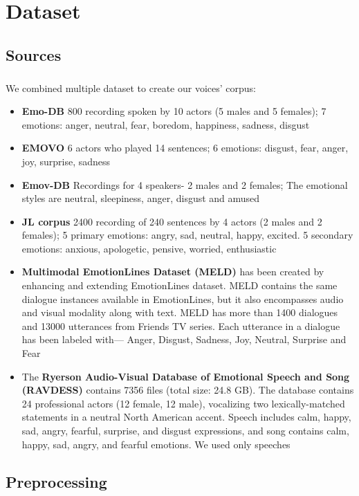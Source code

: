 \chapter{Dataset}

\section{Sources}

\paragraph{}
We combined multiple dataset to create our voices' corpus:

\begin{itemize}
	\item 
	\textbf{Emo-DB} \cite{krautdb} 800 recording spoken by 10 actors (5 males and 5 females); 7 emotions: anger, neutral, fear, boredom, happiness, sadness, disgust
	
	\item
	\textbf{EMOVO} \cite{costantini-etal-2014-emovo} 6 actors who played 14 sentences; 6 emotions: disgust, fear, anger, joy, surprise, sadness
	
	\item 
	\textbf{Emov-DB} \cite{adigwe2018emotional} Recordings for 4 speakers- 2 males and 2 females; The emotional styles are neutral, sleepiness, anger, disgust and amused
	
	\item 
	\textbf{JL corpus} \cite{jl-corpus} 2400 recording of 240 sentences by 4 actors (2 males and 2 females); 5 primary emotions: angry, sad, neutral, happy, excited. 5 secondary emotions: anxious, apologetic, pensive, worried, enthusiastic
	
	\item 
	\textbf{Multimodal EmotionLines Dataset (MELD)} \cite{poria2019meld} has been created by enhancing and extending EmotionLines dataset. MELD contains the same dialogue instances available in EmotionLines, but it also encompasses audio and visual modality along with text. MELD has more than 1400 dialogues and 13000 utterances from Friends TV series. Each utterance in a dialogue has been labeled with— Anger, Disgust, Sadness, Joy, Neutral, Surprise and Fear
	
	\item
	The \textbf{Ryerson Audio-Visual Database of Emotional Speech and Song (RAVDESS)} \cite{livingstone_steven_r_2018_1188976} contains 7356 files (total size: 24.8 GB). The database contains 24 professional actors (12 female, 12 male), vocalizing two lexically-matched statements in a neutral North American accent. Speech includes calm, happy, sad, angry, fearful, surprise, and disgust expressions, and song contains calm, happy, sad, angry, and fearful emotions. We used only speeches
\end{itemize}

\section{Preprocessing}

